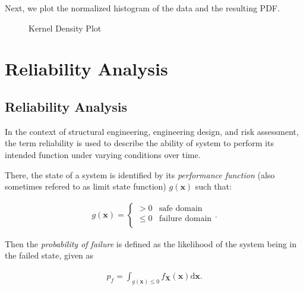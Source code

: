 Next, we plot the normalized histogram of the data and the resulting PDF.





\begin{figure}
\centering
{}
\caption{Kernel Density Plot}
\end{figure}




\chapter{Reliability Analysis}


\section{Reliability Analysis}



\label{5425193432845275192}{}


In the context of structural engineering, engineering design, and risk assessment, the term reliability is used to describe the ability of system to perform its intended function under varying conditions over time.



There, the state of a system is identified by its \emph{performance function} (also sometimes refered to as limit state function) \(g(\boldsymbol{x})\) such that:



\begin{equation*}
\begin{split}g(\boldsymbol{x}) =
\begin{cases}
    > 0 & \text{safe\ domain}\\
    \leq 0 & \text{failure \ domain}\\
\end{cases}.\end{split}\end{equation*}


Then the \emph{probability of failure} is defined as the likelihood of the system being in the failed state, given as



\begin{equation*}
\begin{split}p_f = \int_{g(\boldsymbol{x}) \leq 0} f_{\boldsymbol{X}}(\boldsymbol{x}) \mathrm{d} \boldsymbol{x}.\end{split}\end{equation*}


